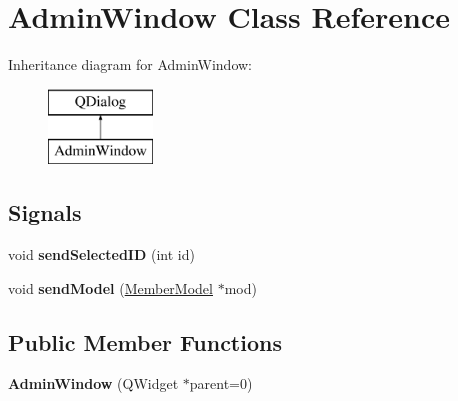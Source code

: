 \hypertarget{class_admin_window}{}\section{Admin\+Window Class Reference}
\label{class_admin_window}
Inheritance diagram for Admin\+Window\+:\begin{figure}[H]
\begin{center}
\leavevmode
\includegraphics[height=2.000000cm]{class_admin_window}
\end{center}
\end{figure}
\subsection*{Signals}
\begin{DoxyCompactItemize}
\item 
\mbox{\label{class_admin_window_a2e6bb3162aebae122abc71e1086b9541}} 
void {\bfseries send\+Selected\+ID} (int id)
\item 
\mbox{\label{class_admin_window_ad4114115ca5ea21c9959b6d35d9884f7}} 
void {\bfseries send\+Model} (\mbox{\hyperlink{class_member_model}{Member\+Model}} $\ast$mod)
\end{DoxyCompactItemize}
\subsection*{Public Member Functions}
\begin{DoxyCompactItemize}
\item 
\mbox{\label{class_admin_window_a9851707c3d87acec48db6db86ae04ca4}} 
{\bfseries Admin\+Window} (Q\+Widget $\ast$parent=0)
\end{DoxyCompactItemize}
